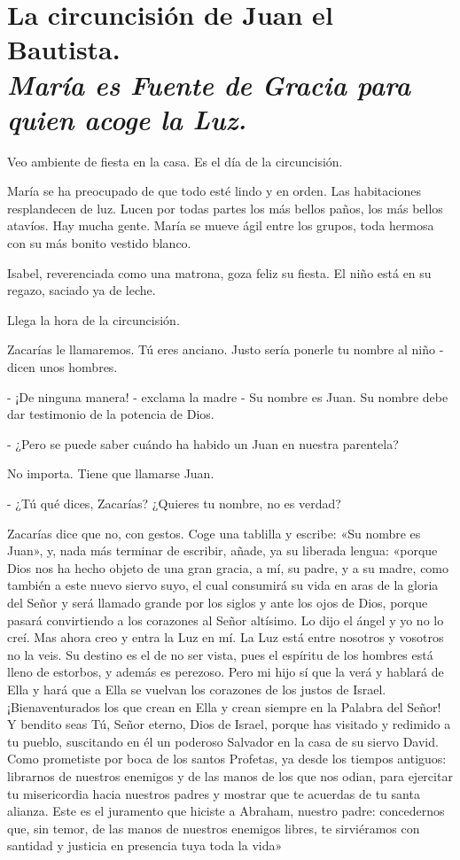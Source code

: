 \documentclass[12pt, twoside, openright]{book} %
\begin{document}
\chapter*{La circuncisión de Juan el Bautista. \\ \normalfont\normalsize\textit{María es Fuente de Gracia para quien acoge la Luz.}}
 
Veo ambiente de fiesta en la casa. Es el día de la circuncisión. 

María se ha preocupado de que todo esté lindo y en orden. Las habitaciones resplandecen de luz. Lucen por todas partes los más bellos paños, los más bellos atavíos. Hay mucha gente. María se mueve ágil entre los grupos, toda hermosa con su más bonito vestido blanco. 

Isabel, reverenciada como una matrona, goza feliz su fiesta. El niño está en su regazo, saciado ya de leche. 

Llega la hora de la circuncisión. 

Zacarías le llamaremos. Tú eres anciano. Justo sería ponerle tu nombre al niño - dicen unos hombres. 

- ¡De ninguna manera! - exclama la madre - Su nombre es Juan. Su nombre debe dar testimonio de la potencia de Dios. 

- ¿Pero se puede saber cuándo ha habido un Juan en nuestra parentela? 

No importa. Tiene que llamarse Juan. 

- ¿Tú qué dices, Zacarías? ¿Quieres tu nombre, no es verdad? 

Zacarías dice que no, con gestos. Coge una tablilla y escribe: «Su nombre es Juan», y, nada más terminar de escribir, añade, ya su liberada lengua: «porque Dios nos ha hecho objeto de una gran gracia, a mí, su padre, y a su madre, como también a este nuevo siervo suyo, el cual consumirá su vida en aras de la gloria del Señor y será llamado grande por los siglos y ante los ojos de Dios, porque pasará convirtiendo a los corazones al Señor altísimo. Lo dijo el ángel y yo no lo creí. Mas ahora creo y entra la Luz en mí. La Luz está entre nosotros y vosotros no la veis. Su destino es el de no ser vista, pues el espíritu de los hombres está lleno de estorbos, y además es perezoso. Pero mi hijo sí que la verá y hablará de Ella y hará que a Ella se vuelvan los corazones de los justos de Israel. ¡Bienaventurados los que crean en Ella y crean siempre en la Palabra del Señor! Y bendito seas Tú, Señor eterno, Dios de Israel, porque has visitado y redimido a tu pueblo, suscitando en él un poderoso Salvador en la casa de su siervo David. Como prometiste por boca de los santos Profetas, ya desde los tiempos antiguos: librarnos de nuestros enemigos y de las manos de los que nos odian, para ejercitar tu misericordia hacia nuestros padres y mostrar que te acuerdas de tu santa alianza. Este es el juramento que hiciste a Abraham, nuestro padre: concedernos que, sin temor, de las manos de nuestros enemigos libres, te sirviéramos con santidad y justicia en presencia tuya toda la vida» 
\end{document}
